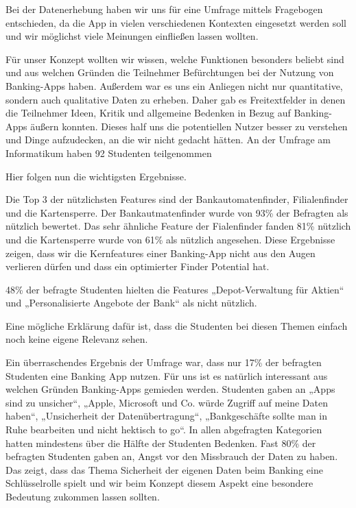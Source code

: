 	Bei der Datenerhebung haben wir uns für eine Umfrage mittels Fragebogen entschieden, da die App in vielen verschiedenen Kontexten eingesetzt werden soll und wir möglichst viele Meinungen einfließen lassen wollten. 
	
	Für unser Konzept wollten wir wissen, welche Funktionen besonders beliebt sind und aus welchen Gründen die Teilnehmer Befürchtungen bei der Nutzung von Banking-Apps haben. Außerdem war es uns ein Anliegen nicht nur quantitative, sondern auch qualitative Daten zu erheben. Daher gab es Freitextfelder in denen die Teilnehmer Ideen, Kritik und allgemeine Bedenken in Bezug auf Banking-Apps äußern konnten. Dieses half uns die potentiellen Nutzer besser zu verstehen und Dinge aufzudecken, an die wir nicht gedacht hätten. An der Umfrage am Informatikum haben 92 Studenten teilgenommen
	
	Hier folgen nun die wichtigsten Ergebnisse. 

	Die Top 3 der nützlichsten Features sind der Bankautomatenfinder,  Filialenfinder und die Kartensperre. Der Bankautmatenfinder wurde von 93\% der Befragten als nützlich bewertet. Das sehr ähnliche Feature der Fialenfinder fanden 81\% nützlich und die Kartensperre wurde von 61\% als nützlich angesehen. Diese Ergebnisse zeigen, dass wir die Kernfeatures einer Banking-App nicht aus den Augen verlieren dürfen und dass ein optimierter Finder Potential hat.
	
	48\% der befragte Studenten hielten die Features „Depot-Verwaltung für Aktien“ und „Personalisierte Angebote der Bank“ als nicht nützlich.
	
	Eine mögliche Erklärung dafür ist, dass die Studenten bei diesen Themen einfach noch keine eigene Relevanz sehen. 
	
	Ein überraschendes Ergebnis der Umfrage war, dass nur 17\% der befragten Studenten eine Banking App nutzen. Für uns ist es natürlich interessant aus welchen Gründen Banking-Apps gemieden werden. Studenten gaben an „Apps sind zu unsicher“, „Apple, Microsoft und Co. würde Zugriff auf meine Daten haben“, „Unsicherheit der Datenübertragung“, „Bankgeschäfte sollte man in Ruhe bearbeiten und nicht hektisch to go“. In allen abgefragten Kategorien hatten mindestens über die Hälfte der Studenten Bedenken. Fast 80\% der befragten Studenten gaben an,  Angst vor den Missbrauch der Daten zu haben. Das zeigt, dass das Thema Sicherheit der eigenen Daten beim Banking eine Schlüsselrolle spielt und wir beim Konzept diesem Aspekt eine besondere Bedeutung zukommen lassen sollten.
	
